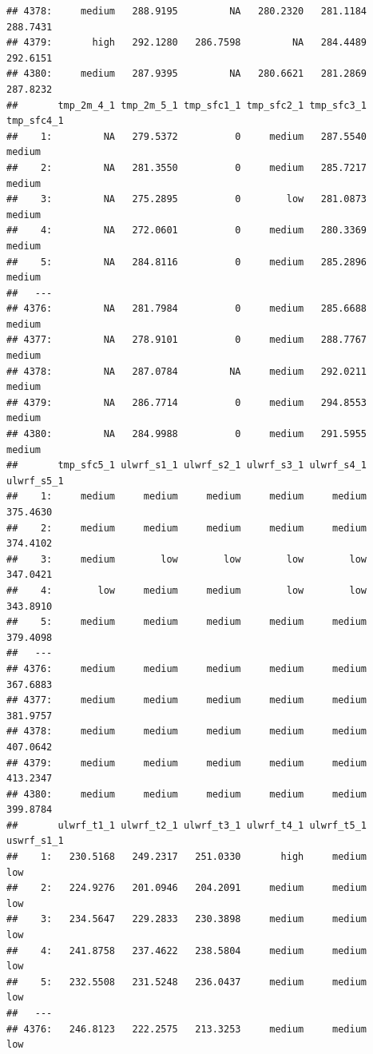 \documentclass[
  11pt,
  a4paper,
]{article}
\begin{document}
\begin{verbatim}
## 4378:     medium   288.9195         NA   280.2320   281.1184   288.7431
## 4379:       high   292.1280   286.7598         NA   284.4489   292.6151
## 4380:     medium   287.9395         NA   280.6621   281.2869   287.8232
##       tmp_2m_4_1 tmp_2m_5_1 tmp_sfc1_1 tmp_sfc2_1 tmp_sfc3_1 tmp_sfc4_1
##    1:         NA   279.5372          0     medium   287.5540     medium
##    2:         NA   281.3550          0     medium   285.7217     medium
##    3:         NA   275.2895          0        low   281.0873     medium
##    4:         NA   272.0601          0     medium   280.3369     medium
##    5:         NA   284.8116          0     medium   285.2896     medium
##   ---                                                                  
## 4376:         NA   281.7984          0     medium   285.6688     medium
## 4377:         NA   278.9101          0     medium   288.7767     medium
## 4378:         NA   287.0784         NA     medium   292.0211     medium
## 4379:         NA   286.7714          0     medium   294.8553     medium
## 4380:         NA   284.9988          0     medium   291.5955     medium
##       tmp_sfc5_1 ulwrf_s1_1 ulwrf_s2_1 ulwrf_s3_1 ulwrf_s4_1 ulwrf_s5_1
##    1:     medium     medium     medium     medium     medium   375.4630
##    2:     medium     medium     medium     medium     medium   374.4102
##    3:     medium        low        low        low        low   347.0421
##    4:        low     medium     medium        low        low   343.8910
##    5:     medium     medium     medium     medium     medium   379.4098
##   ---                                                                  
## 4376:     medium     medium     medium     medium     medium   367.6883
## 4377:     medium     medium     medium     medium     medium   381.9757
## 4378:     medium     medium     medium     medium     medium   407.0642
## 4379:     medium     medium     medium     medium     medium   413.2347
## 4380:     medium     medium     medium     medium     medium   399.8784
##       ulwrf_t1_1 ulwrf_t2_1 ulwrf_t3_1 ulwrf_t4_1 ulwrf_t5_1 uswrf_s1_1
##    1:   230.5168   249.2317   251.0330       high     medium        low
##    2:   224.9276   201.0946   204.2091     medium     medium        low
##    3:   234.5647   229.2833   230.3898     medium     medium        low
##    4:   241.8758   237.4622   238.5804     medium     medium        low
##    5:   232.5508   231.5248   236.0437     medium     medium        low
##   ---                                                                  
## 4376:   246.8123   222.2575   213.3253     medium     medium        low

\end{verbatim}
\end{document}
